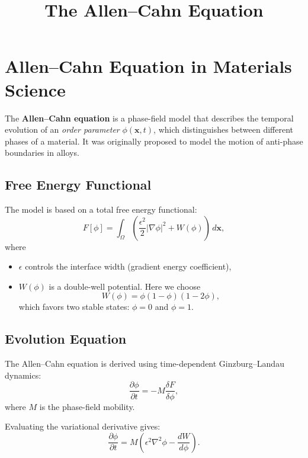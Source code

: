 \documentclass[12pt,a4paper]{article}
\title{The Allen--Cahn Equation}
\author{}
\date{}
\begin{document}
\maketitle

\section*{Allen--Cahn Equation in Materials Science}

The \textbf{Allen--Cahn equation} is a phase-field model that describes the temporal evolution of an 
\emph{order parameter} \(\phi(\mathbf{x},t)\), which distinguishes between different phases of a material. 
It was originally proposed to model the motion of anti-phase boundaries in alloys.

\subsection*{Free Energy Functional}

The model is based on a total free energy functional:
\begin{equation}
F[\phi] = \int_\Omega \left( \frac{\epsilon^2}{2} |\nabla \phi|^2 + W(\phi) \right) \, d\mathbf{x},
\end{equation}
where
\begin{itemize}
    \item \(\epsilon\) controls the interface width (gradient energy coefficient),
    \item \(W(\phi)\) is a double-well potential. Here we choose
    \begin{equation}
    W(\phi) = \phi (1 - \phi)(1 - 2\phi),
    \end{equation}
    which favors two stable states: \(\phi = 0\) and \(\phi = 1\).
\end{itemize}

\subsection*{Evolution Equation}

The Allen--Cahn equation is derived using time-dependent Ginzburg--Landau dynamics:
\begin{equation}
\frac{\partial \phi}{\partial t} = -M \frac{\delta F}{\delta \phi},
\end{equation}
where \(M\) is the phase-field mobility.

Evaluating the variational derivative gives:
\begin{equation}
\frac{\partial \phi}{\partial t} =
M \left( \epsilon^2 \nabla^2 \phi - \frac{dW}{d\phi} \right).
\end{equation}
\end{document}
